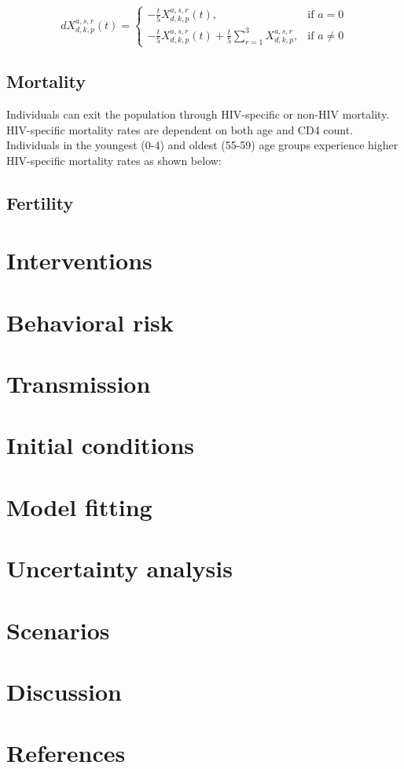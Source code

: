 \documentclass[11pt,a4paper]{article}
\begin{document}
	\[
			dX_{d,k,p}^{a,s,r}(t) =
		\begin{cases}
			-\frac{t}{5}X_{d,k,p}^{a,s,r}(t), & \text{if } a=0\\
			-\frac{t}{5}X_{d,k,p}^{a,s,r}(t) + \frac{t}{5}\sum\limits_{r=1}^3 X_{d,k,p}^{a,s,r}, & \text{if } a\neq0
		\end{cases}
	\]

	\subsection{Mortality}
	Individuals can exit the population through HIV-specific or non-HIV mortality. HIV-specific mortality rates are dependent on both age and CD4 count. Individuals in the youngest (0-4) and oldest (55-59) age groups experience higher HIV-specific mortality rates as shown below:	


	\subsection{Fertility}




\section{Interventions}

\section{Behavioral risk}

\section{Transmission}


\section{Initial conditions}

\section{Model fitting}

\section{Uncertainty analysis}

\section{Scenarios}

\section{Discussion}

\section{References}
\end{document}
